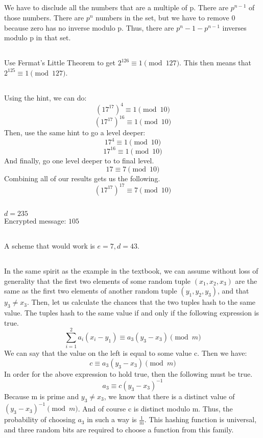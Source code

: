\documentclass{article}
\begin{document}
\subsection{}We have to disclude all the numbers that are a multiple of p. There are $p^{n-1}$ of those numbers. There are $p^n$ numbers in the set, but we have to remove $0$ because zero has no inverse modulo p. Thus, there are $p^n-1-p^{n-1}$ inverses modulo p in that set. 
\subsection{}Use Fermat's Little Theorem to get $2^{126} \equiv 1 \pmod {127}$. This then means that $2^{125} \equiv 1 \pmod {127}$.
\subsection{}Using the hint, we can do:
$$(17^{17})^4 \equiv 1 \pmod {10}$$
$$(17^{17})^{16} \equiv 1 \pmod {10}$$
Then, use the same hint to go a level deeper:
$$17^4 \equiv 1 \pmod{10}$$
$$17^{16} \equiv 1 \pmod{10}$$
And finally, go one level deeper to to final level. 
$$17 \equiv 7 \pmod{10}$$
Combining all of our results gets us the following. 
$$(17^{17})^{17} \equiv 7 \pmod{10}$$
\subsection{}
$d=235$\\
Encrypted message: $105$
\subsection{}
A scheme that would work is $e=7, d=43$. 
\subsection{}
\subsubsection{}
In the same spirit as the example in the textbook, we can assume without loss of generality that the first two elements of some random tuple $(x_1, x_2, x_3)$ are the same as the first two elements of another random tuple $(y_1, y_2, y_3)$, and that $y_3 \neq x_3$. Then, let us calculate the chances that the two tuples hash to the same value. The tuples hash to the same value if and only if the following expression is true. 
$$\sum_{i=1}^2a_i(x_i-y_1) \equiv a_3(y_3-x_3) \pmod m$$
We can say that the value on the left is equal to some value c. Then we have:
$$c \equiv a_3(y_3-x_3) \pmod m$$
In order for the above expression to hold true, then the following must be true. 
$$a_3 \equiv c(y_3-x_3)^{-1}$$
Because m is prime and $y_3 \neq x_3$, we know that there is a distinct value of $(y_3-x_3)^{-1} \pmod m$. And of course c is distinct modulo m. Thus, the probability of choosing $a_3$ in such a way is $\frac{1}{m}$. This hashing function is universal, and three random bits are required to choose a function from this family. 
\end{document}
